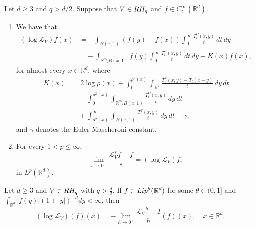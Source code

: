 \documentclass[10pt,a4paper]{amsart}
\newcommand{\Lip}{\textup{Lip}}
\newcommand{\RH}{\textup{RH}}
\newcommand{\RR}{\mathbb{R}}
\begin{document}
\begin{thm}\label{thm: 1.2} 
    Let $d \geq 3$ and $q > d/2$. Suppose that $V \in \RH_q$ and $f \in C^\infty_c(\mathbb{R}^d)$. 
    \begin{enumerate}
        \item \label{item: teo 1.2 - a} We have that
        \begin{equation}\label{eq: teo 1.2}
        \begin{split}
            (\log\mathcal{L}_V)f(x) & = -\int_{B(x,1)} (f(y)-f(x)) \int_0^\infty \frac{T_t^V(x,y)}{t} \, dt \, dy \\
            & \quad - \int_{\mathbb{R}^d \setminus B(x,1)} f(y) \int_0^\infty \frac{T_t^V(x,y)}{t} \, dt \, dy - K(x)f(x),
        \end{split}
        \end{equation}
        for almost every $x \in \mathbb{R}^d$, where
        \begin{equation*}
        \begin{split}
            K(x) & = 2 \log \rho(x) + \int_0^{\rho^2(x)} \int_{\mathbb{R}^d} \frac{T_t^V(x,y) - T_t(x-y)}{t} \, dy \, dt \\
            & \quad - \int_0^{\rho^2(x)} \int_{\mathbb{R}^d \setminus B(x,1)} \frac{T_t^V(x,y)}{t} \, dy \, dt \\
            & \quad + \int_{\rho^2(x)}^\infty \int_{B(x,1)} \frac{T_t^V(x,y)}{t} \, dy \, dt +\gamma,
        \end{split}
        \end{equation*}
        and $\gamma$ denotes the Euler-Mascheroni constant.

        \item \label{item: teo 1.2 - b} For every $1 < p \leq \infty$,
        \begin{equation*}
            \lim_{s \rightarrow 0^{+}} \frac{\mathcal{L}_V^s f - f}{s} = (\log \mathcal{L}_V) f, 
        \end{equation*}
        in $L^p(\mathbb{R}^d)$.
    \end{enumerate}
\end{thm}

\begin{cor}\label{coro: 2.1}
    Let $d\geq 3$ and $V\in \RH_q$ with $q>\frac d2$. If $f\in \Lip^\theta (\RR^d)$ for some $\theta\in (0,1]$ and $\int_{\RR^d} |f(y)|(1+|y|)^{-d}dy<\infty$, then
    \[(\log \mathcal{L}_V)(f)(x)=-\lim_{h\to 0^+}\frac{\mathcal{L}^{-h}_V-I}{h}(f)(x), \quad  x\in \RR^d.\]
\end{cor}
\end{document}
